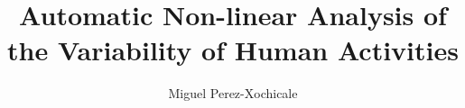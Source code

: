 \documentclass[10pt,journal,compsoc]{IEEEtran}
\begin{document}
%
\title{Automatic Non-linear Analysis of the Variability of Human Activities}
%
%
%
%

\author{Miguel Perez-Xochicale
}
\end{document}
